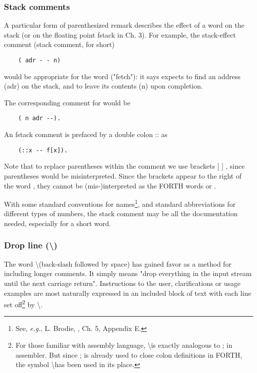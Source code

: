 \subsubsection{Stack comments}
A particular form of parenthesized remark describes the effect of a word on the stack (or on the ﬂoating point fstack in Ch. 3). For example, the stack-effect comment (stack comment, for short)

\begin{lstlisting}
    ( adr - - n)
\end{lstlisting}

would be appropriate for the word  ("fetch"): it says  expects to find an address (adr) on the stack, and to leave its contents (n) upon completion.

The corresponding comment for \bc{!} would be
\begin{lstlisting}
    ( n adr --).
\end{lstlisting}

An fstack comment is prefaced by a double colon :: as
\begin{lstlisting}
    (::x -- f[x]).
\end{lstlisting}

Note that to replace parentheses within the comment we use brackets [ ] , since parentheses would be misinterpreted. Since the brackets appear to the right of the word \bc{(} , they cannot be (mis-)interpreted as the FORTH words \bc{]} or \bc{[}.

With some standard conventions for names\footnote{See, \textit{e.g.}, L. Brodie, \TF, Ch. 5, Appendix E.}, and standard abbreviations for different types of numbers, the stack comment may be all the documentation needed, especially for a short word.

\subsubsection{Drop line (\textbackslash)}
The word \textbackslash (back-slash followed by space) has gained favor as a method for including longer comments. It simply means "drop everything in the input stream until the next carriage return". Instructions to the user, clarifications or usage examples are most naturally expressed in an included block of text with each line set off\footnote{For those familiar with assembly language, \textbackslash is exactly analogous to ; in assembler. But since ; is already used to close colon definitions in FORTH, the symbol \textbackslash has been used in its place.} by \textbackslash .

